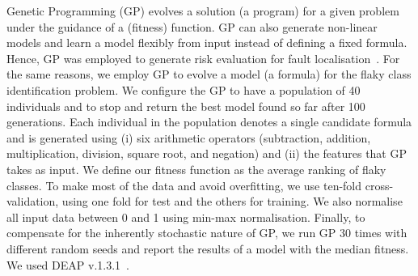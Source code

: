 Genetic Programming (GP) evolves a solution (\ie a program) for a given problem under the guidance of a (fitness) function. %
GP can also  generate non-linear models and learn a model flexibly from input instead of defining a fixed formula. Hence, GP was employed to generate risk evaluation \formulas for fault localisation~\cite{Yoo:2017ss,sohn-TSE}. 
For the same reasons, we employ GP to evolve a model (\ie a formula) for the flaky class identification problem. 
We configure the GP to have a population of 40 individuals and to stop and return the best model found so far after 100 generations. 
Each individual in the population denotes a single candidate formula and is generated using (i) six arithmetic operators (subtraction, addition, multiplication, division, square root, and negation) and (ii) the features that GP takes as input.
We define our fitness function as the average ranking of flaky classes. To make most of the data and avoid overfitting, we use ten-fold cross-validation, using one fold for test and the others for training. We also normalise all input data between 0 and 1 using min-max normalisation. 
Finally, to compensate for the inherently stochastic nature of GP, we run GP 30 times with different random seeds and report the results of a model with the median fitness. %
We used DEAP v.1.3.1~\cite{Fortin:2012aa}. 

